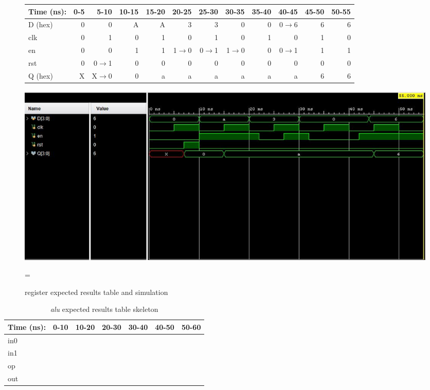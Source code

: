 \documentclass[11pt]{article}
\begin{document}
\begin{figure}[ht]\centering
	\begin{tabular}{l|rrrrrrrrrrr}
		Time (ns): & 0-5 & 5-10 & 10-15 & 15-20 & 20-25 & 25-30 & 30-35 & 35-40
		& 40-45 & 45-50 & 50-55 \\
		\midrule
		D (hex) & 0 & 0     & A & A & 3         & 3       & 0           & 0 & 
		0$\to$6 & 6 & 6 \\
		clk     & 0 & 1     & 0 & 1 & 0         & 1       & 0           & 1 & 0 
		& 1 & 0 \\
		en    & 0 & 0       & 1 & 1 & 1$\to$0 & 0$\to$1 & 1$\to$0 & 0 & 0$\to$1
		& 1 & 1 \\
		rst   & 0 & 0$\to$1 & 0 & 0 & 0          & 0     & 0       & 0 & 0
		& 0 & 0 \\
		\midrule
		Q (hex) & X & X$\to$0 & 0 & a  & a & a & a & a & a & 6 & 6 \\
		\bottomrule
	\end{tabular}
	
	\includegraphics[width=1.0\textwidth]{Register Module}
	\caption{register expected results table and simulation}
	\label{fig:sim_with_table}=
\end{figure}
\clearpage


\begin{table}[ht]\centering
	\caption{\textit{alu} expected results table skeleton}
	\label{ALU:tbl:alu_ERT}\medskip
	\begin{tabular}{l|rrrrrr}
		Time (ns): & 0-10 & 10-20 & 20-30 & 30-40 & 40-50 & 50-60 \\
		\midrule
		in0 &  &  &  &  &  &  \\
		in1 &  &  &  &  &  &  \\
		op    &  &  &  &  &  &  \\
		\midrule
		out &  &  &  &  &  &  \\
		\bottomrule
	\end{tabular}
\end{table}
\end{document}
